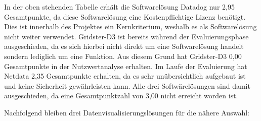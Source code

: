 \begin{table}[H]
\caption{Nutzwertanalyse Datadog, Gridster-D3 und Netdata}
\label{nwa_dgn}
\end{table}

In der oben stehenden Tabelle erhält die Softwarelösung Datadog nur 2,95
Gesamtpunkte, da diese Softwarelösung eine Kostenpflichtige Lizenz benötigt.
Dies ist innerhalb des Projektes ein Kernkriterium, weshalb es als
Softwarelösung nicht weiter verwendet. Gridster-D3 ist bereits während der
Evaluierungsphase ausgeschieden, da es sich hierbei nicht direkt um eine
Softwarelösung handelt sondern lediglich um eine Funktion. Aus diesem Grund
hat Gridster-D3 0,00 Gesamtpunkte in der Nutzwertanalyse erhalten. Im Laufe der
Evaluierung hat Netdata 2,35 Gesamtpunkte erhalten, da es sehr unübersichtlich
aufgebaut ist und keine Sicherheit gewährleisten kann. Alle drei
Softwärelösungen sind damit ausgeschieden, da eine Gesamtpunktzahl von 3,00
nicht erreicht worden ist.

Nachfolgend bleiben drei Datenvisualisierungslösungen für die nähere Auswahl:

